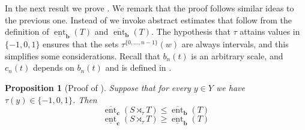 \documentclass[a4paper,oneside]{amsart}
\renewcommand{\(}{\begin{dmath*}}
\renewcommand{\)}{\end{dmath*}}
\newtheorem{proposition}[theorem]{Proposition}
\theoremstyle{definition}
\newcommand{\upperent}{\overline{\operatorname{ent}}}
\newcommand{\lowerent}{\underline{\operatorname{ent}}}
\begin{document}
In the next result we prove . We remark that the proof follows similar ideas to the previous one. Instead of  we invoke abstract estimates that follow from the definition of $\lowerent_{\textbf{b}}(T)$ and $\upperent_{\textbf{b}}(T)$. The hypothesis that $\tau$ attains values in $\{-1,0,1\}$ ensures that the sets $\tau^{\{0,\dots,n-1\}}(w)$ are always intervals, and this simplifies some considerations. Recall that $b_n(t)$ is an arbitrary scale, and $c_n(t)$ depends on $b_n(t)$ and is defined in .
\begin{proposition}[Proof of ]
Suppose that for every $y\in Y$ we have $\tau(y)\in \{-1,0,1\}$. Then
\[\upperent_{\textbf{c}}(S\rtimes_\tau T)\leq \upperent_{\textbf{b}}(T)\]
\[\lowerent_{\textbf{c}}(S\rtimes_\tau T)\geq \lowerent_{\textbf{b}}(T)\]
\end{proposition}
\end{document}
